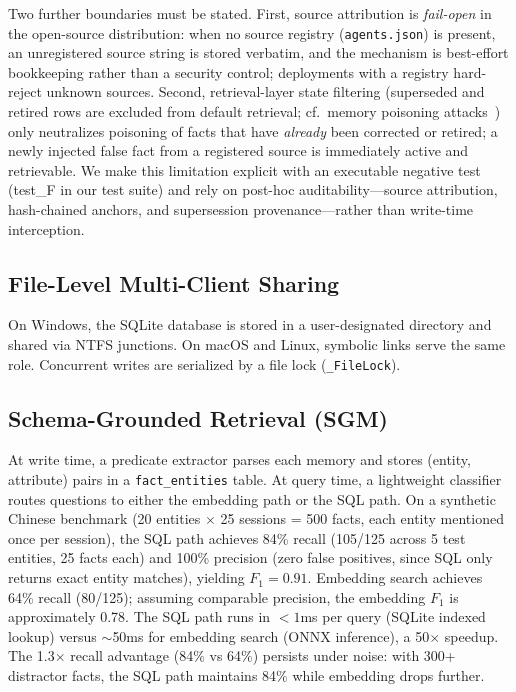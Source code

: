 \documentclass{article}
\begin{document}
Two further boundaries must be stated. First, source attribution is \emph{fail-open} in the open-source distribution: when no source registry (\texttt{agents.json}) is present, an unregistered source string is stored verbatim, and the mechanism is best-effort bookkeeping rather than a security control; deployments with a registry hard-reject unknown sources. Second, retrieval-layer state filtering (superseded and retired rows are excluded from default retrieval; cf.\ memory poisoning attacks~\citep{sleeper,agentpoison}) only neutralizes poisoning of facts that have \emph{already} been corrected or retired; a newly injected false fact from a registered source is immediately active and retrievable. We make this limitation explicit with an executable negative test (test\_F in our test suite) and rely on post-hoc auditability---source attribution, hash-chained anchors, and supersession provenance---rather than write-time interception.

\subsection{File-Level Multi-Client Sharing}
On Windows, the SQLite database is stored in a user-designated directory and shared via NTFS junctions. On macOS and Linux, symbolic links serve the same role. Concurrent writes are serialized by a file lock (\texttt{\_FileLock}).

\subsection{Schema-Grounded Retrieval (SGM)}
At write time, a predicate extractor parses each memory and stores (entity, attribute) pairs in a \texttt{fact\_entities} table. At query time, a lightweight classifier routes questions to either the embedding path or the SQL path. On a synthetic Chinese benchmark (20 entities $\times$ 25 sessions = 500 facts, each entity mentioned once per session), the SQL path achieves 84\% recall (105/125 across 5 test entities, 25 facts each) and 100\% precision (zero false positives, since SQL only returns exact entity matches), yielding $F_1 = 0.91$. Embedding search achieves 64\% recall (80/125); assuming comparable precision, the embedding $F_1$ is approximately 0.78. The SQL path runs in $< 1$ms per query (SQLite indexed lookup) versus $\sim$50ms for embedding search (ONNX inference), a 50$\times$ speedup. The 1.3$\times$ recall advantage (84\% vs 64\%) persists under noise: with 300+ distractor facts, the SQL path maintains 84\% while embedding drops further.
\end{document}
